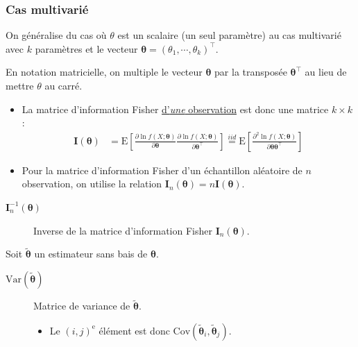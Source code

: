 \documentclass[10pt, french]{article}
\begin{document}
\begin{multicols*}{2}
\subsubsection{Cas multivarié}
On généralise du cas où $\theta$ est un scalaire (un seul paramètre) au cas multivarié avec $k$ paramètres et le vecteur $\bm{\theta}	=	(\theta_{1}, \cdots, \theta_{k})^{\top}$.\\


\begin{distributions}[Notation]
En notation matricielle, on multiple le vecteur $\bm{\theta}$ par la transposée $\bm{\theta}^{\top}$ au lieu de mettre $\theta$ au carré. 
\begin{itemize}
	\item	La matrice d'information Fisher \underline{d'\textit{une} observation} est donc une matrice $k \times k$:
\begin{align*}
	\bm{I}(\bm{\theta})
	&=	\text{E}\left[	
			\frac{\partial \ln f(X; \bm{\theta})}{\partial \bm{\theta}}
			\frac{\partial \ln f(X; \bm{\theta})}{\partial \bm{\theta}^{\top}}
		\right]
	\overset{iid}{=}	\text{E}\left[	
			\frac{\partial^{2} \ln f(X; \bm{\theta})}{\partial \bm{\theta}\bm{\theta}^{\top}}
		\right]
\end{align*}
	\item	Pour la matrice d'information Fisher d'un échantillon aléatoire de $n$ observation, on utilise la relation $\bm{I}_{n}(\bm{\theta})	=	n\bm{I}(\bm{\theta})$.
\end{itemize}
\begin{description}
	\item[$\bm{I}^{-1}_{n}(\bm{\theta})$]	Inverse de la matrice d'information Fisher $\bm{I}_{n}(\bm{\theta})$.
\end{description}
\end{distributions}

Soit $\tilde{\bm{\theta}}$ un estimateur sans bais de $\bm{\theta}$. 

\begin{distributions}[Notation]
\begin{description}
	\item[$\text{Var}(\tilde{\bm{\theta}})$]	Matrice de variance de $\tilde{\bm{\theta}}$.
		\begin{itemize}
		\item	Le $(i, j)^{\text{e}}$ élément est donc $\text{Cov}(\tilde{\bm{\theta}}_{i}, \tilde{\bm{\theta}}_{j})$.
		\end{itemize}
\end{description}
\end{distributions}


\end{multicols*}
\end{document}
